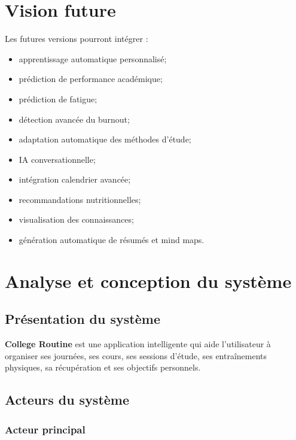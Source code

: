 \documentclass[12pt]{article}
\begin{document}
\section{Vision future}

Les futures versions pourront intégrer :
\begin{itemize}
    \item apprentissage automatique personnalisé;
    \item prédiction de performance académique;
    \item prédiction de fatigue;
    \item détection avancée du burnout;
    \item adaptation automatique des méthodes d’étude;
    \item IA conversationnelle;
    \item intégration calendrier avancée;
    \item recommandations nutritionnelles;
    \item visualisation des connaissances;
    \item génération automatique de résumés et mind maps.
\end{itemize}
\section{Analyse et conception du système}

\subsection{Présentation du système}

\textbf{College Routine} est une application intelligente qui aide l'utilisateur à organiser ses journées, ses cours, ses sessions d'étude, ses entraînements physiques, sa récupération et ses objectifs personnels.

\subsection{Acteurs du système}

\subsubsection{Acteur principal}
\end{document}

